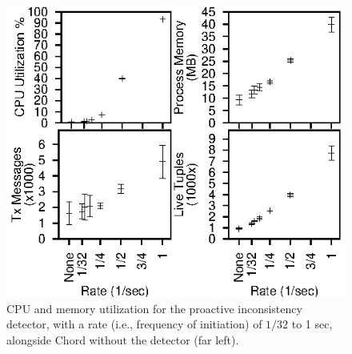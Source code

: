 \documentclass{sig-alt-full}
\begin{document}
\begin{figure}
\centerline{\includegraphics{newResults/proactiveConsistency}}
\caption{CPU and memory utilization for the
  proactive inconsistency detector, with a rate
  (i.e., frequency of initiation) of $1/32$ to 1
  sec, alongside Chord without the detector (far
  left).}
\label{fig:proactiveConsistency}
\end{figure}
\end{document}

